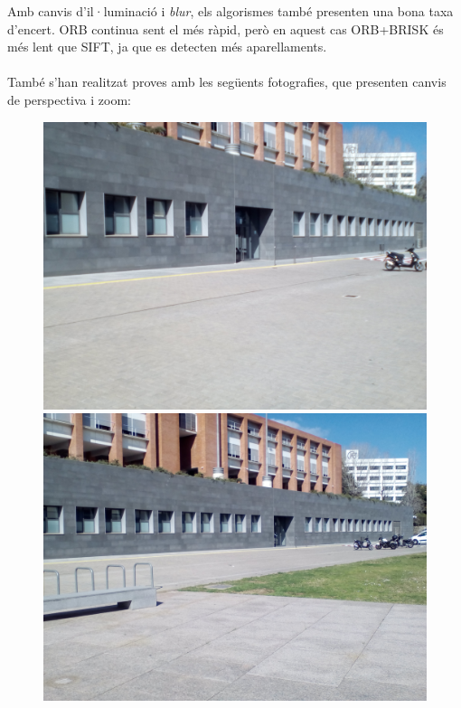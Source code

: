 		\noindent
		Amb canvis d'il·luminació i \textit{blur}, els algorismes també presenten una bona taxa d'encert. ORB continua sent el més ràpid, però en aquest cas ORB+BRISK és més lent que SIFT, ja que es detecten més
		aparellaments.\\\\
		També s'han realitzat proves amb les següents fotografies, que presenten canvis de perspectiva i zoom:

		\begin{figure}[!htb]
				\includegraphics[width=\linewidth]{images/experiments/uni1}
				\label{fig:awesome_image1}
			\endminipage\hfill
				\includegraphics[width=\linewidth]{images/experiments/uni2}

\end{figure}
